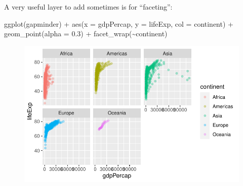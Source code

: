 \documentclass[
  letterpaper,
  DIV=11,
  numbers=noendperiod]{scrartcl}
\newenvironment{Shaded}{\begin{snugshade}}{\end{snugshade}}
\newcommand{\AttributeTok}[1]{\textcolor[rgb]{0.40,0.45,0.13}{#1}}
\newcommand{\FloatTok}[1]{\textcolor[rgb]{0.68,0.00,0.00}{#1}}
\newcommand{\FunctionTok}[1]{\textcolor[rgb]{0.28,0.35,0.67}{#1}}
\newcommand{\NormalTok}[1]{\textcolor[rgb]{0.00,0.23,0.31}{#1}}
\newcommand{\SpecialCharTok}[1]{\textcolor[rgb]{0.37,0.37,0.37}{#1}}
\begin{document}
A very useful layer to add sometimes is for ``faceting'':

\begin{Shaded}
\begin{Highlighting}[]
\FunctionTok{ggplot}\NormalTok{(gapminder) }\SpecialCharTok{+}
  \FunctionTok{aes}\NormalTok{(}\AttributeTok{x =}\NormalTok{ gdpPercap, }\AttributeTok{y =}\NormalTok{ lifeExp, }\AttributeTok{col =}\NormalTok{ continent) }\SpecialCharTok{+}
  \FunctionTok{geom\_point}\NormalTok{(}\AttributeTok{alpha =} \FloatTok{0.3}\NormalTok{) }\SpecialCharTok{+}
  \FunctionTok{facet\_wrap}\NormalTok{(}\SpecialCharTok{\textasciitilde{}}\NormalTok{continent)}
\end{Highlighting}
\end{Shaded}

\begin{figure}[H]

{\centering \includegraphics{class05_files/figure-pdf/unnamed-chunk-14-1.pdf}

}

\end{figure}
\end{document}
